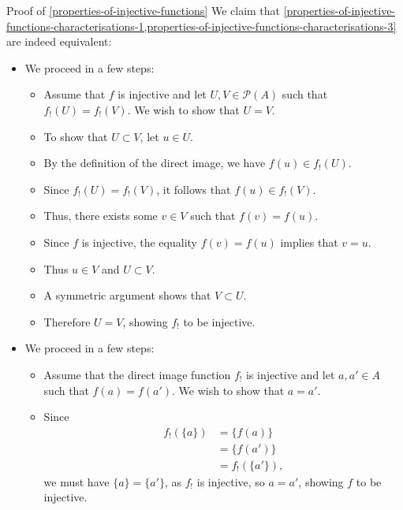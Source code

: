 \begin{Proof}{Proof of \cref{properties-of-injective-functions}}
    We claim that \cref{properties-of-injective-functions-characterisations-1,properties-of-injective-functions-characterisations-3} are indeed equivalent:
    \begin{itemize}
        \item{}We proceed in a few steps:
            \begin{itemize}
                \item Assume that $f$ is injective and let $U,V\in\mathcal{P}(A)$ such that $f_{!}(U)=f_{!}(V)$. We wish to show that $U=V$.
                \item To show that $U\subset V$, let $u\in U$.
                \item By the definition of the direct image, we have $f(u)\in f_{!}(U)$.
                \item Since $f_{!}(U)=f_{!}(V)$, it follows that $f(u)\in f_{!}(V)$.
                \item Thus, there exists some $v\in V$ such that $f(v)=f(u)$.
                \item Since $f$ is injective, the equality $f(v)=f(u)$ implies that $v=u$.
                \item Thus $u\in V$ and $U\subset V$.
                \item A symmetric argument shows that $V\subset U$.
                \item Therefore $U=V$, showing $f_{!}$ to be injective.
            \end{itemize}
        \item{}We proceed in a few steps:
            \begin{itemize}
                \item Assume that the direct image function $f_{!}$ is injective and let $a,a'\in A$ such that $f(a)=f(a')$. We wish to show that $a=a'$.
                \item Since
                    \begin{align*}
                        f_{!}(\{a\}) &= \{f(a)\}\\
                                     &= \{f(a')\}\\
                                     &= f_{!}(\{a'\}),
                    \end{align*}
                    we must have $\{a\}=\{a'\}$, as $f_{!}$ is injective, so $a=a'$, showing $f$ to be injective.
            \end{itemize}
    \end{itemize}


\end{Proof}
